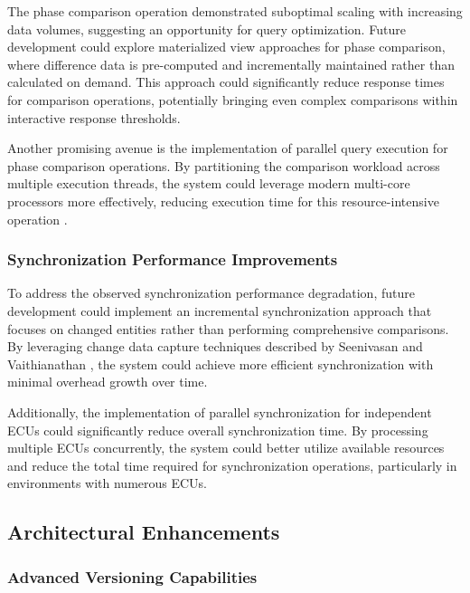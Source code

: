 The phase comparison operation demonstrated suboptimal scaling with increasing data volumes, suggesting an opportunity for query optimization. Future development could explore materialized view approaches for phase comparison, where difference data is pre-computed and incrementally maintained rather than calculated on demand. This approach could significantly reduce response times for comparison operations, potentially bringing even complex comparisons within interactive response thresholds.

Another promising avenue is the implementation of parallel query execution for phase comparison operations. By partitioning the comparison workload across multiple execution threads, the system could leverage modern multi-core processors more effectively, reducing execution time for this resource-intensive operation \cite{obe2017postgresql}.

\subsubsection{Synchronization Performance Improvements}
\label{subsubsec:synchronization-improvements}

To address the observed synchronization performance degradation, future development could implement an incremental synchronization approach that focuses on changed entities rather than performing comprehensive comparisons. By leveraging change data capture techniques described by Seenivasan and Vaithianathan \cite{seenivasan2023real}, the system could achieve more efficient synchronization with minimal overhead growth over time.

Additionally, the implementation of parallel synchronization for independent ECUs could significantly reduce overall synchronization time. By processing multiple ECUs concurrently, the system could better utilize available resources and reduce the total time required for synchronization operations, particularly in environments with numerous ECUs.

\subsection{Architectural Enhancements}
\label{subsec:architectural-enhancements}

\subsubsection{Advanced Versioning Capabilities}
\label{subsubsec:advanced-versioning}

